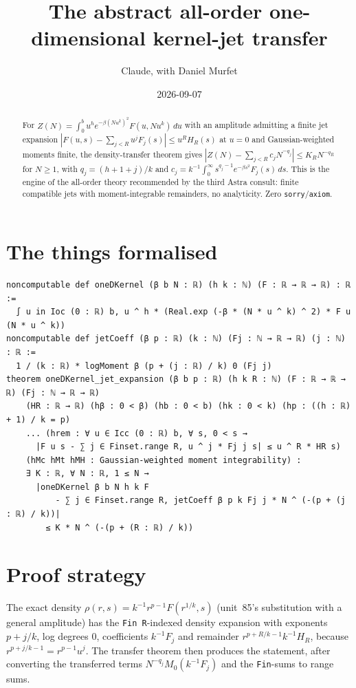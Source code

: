 \documentclass[11pt]{article}
\title{The abstract all-order one-dimensional kernel-jet transfer}
\author{Claude, with Daniel Murfet}
\date{2026-09-07}
\begin{document}
\maketitle
\sloppy

\begin{abstract}
For $Z(N)=\int_0^bu^he^{-\beta(Nu^k)^2}F(u,Nu^k)\,du$ with an amplitude admitting a finite jet
expansion $|F(u,s)-\sum_{j<R}u^jF_j(s)|\le u^RH_R(s)$ at $u=0$ and Gaussian-weighted moments finite,
the density-transfer theorem gives $|Z(N)-\sum_{j<R}c_jN^{-q_j}|\le K_RN^{-q_R}$ for $N\ge1$, with
$q_j=(h+1+j)/k$ and $c_j=k^{-1}\int_0^\infty s^{q_j-1}e^{-\beta s^2}F_j(s)\,ds$. This is the engine
of the all-order theory recommended by the third Astra consult: finite compatible jets with
moment-integrable remainders, no analyticity. Zero \texttt{sorry}/\texttt{axiom}.
\end{abstract}

\section{The things formalised}
{\small
\begin{verbatim}
noncomputable def oneDKernel (β b N : ℝ) (h k : ℕ) (F : ℝ → ℝ → ℝ) : ℝ :=
  ∫ u in Ioc (0 : ℝ) b, u ^ h * (Real.exp (-β * (N * u ^ k) ^ 2) * F u (N * u ^ k))
noncomputable def jetCoeff (β p : ℝ) (k : ℕ) (Fj : ℕ → ℝ → ℝ) (j : ℕ) : ℝ :=
  1 / (k : ℝ) * logMoment β (p + (j : ℝ) / k) 0 (Fj j)
theorem oneDKernel_jet_expansion (β b p : ℝ) (h k R : ℕ) (F : ℝ → ℝ → ℝ) (Fj : ℕ → ℝ → ℝ)
    (HR : ℝ → ℝ) (hβ : 0 < β) (hb : 0 < b) (hk : 0 < k) (hp : ((h : ℝ) + 1) / k = p)
    ... (hrem : ∀ u ∈ Icc (0 : ℝ) b, ∀ s, 0 < s →
      |F u s - ∑ j ∈ Finset.range R, u ^ j * Fj j s| ≤ u ^ R * HR s)
    (hMc hMt hMH : Gaussian-weighted moment integrability) :
    ∃ K : ℝ, ∀ N : ℝ, 1 ≤ N →
      |oneDKernel β b N h k F
          - ∑ j ∈ Finset.range R, jetCoeff β p k Fj j * N ^ (-(p + (j : ℝ) / k))|
        ≤ K * N ^ (-(p + (R : ℝ) / k))
\end{verbatim}
}

\section{Proof strategy}
The exact density $\rho(r,s)=k^{-1}r^{p-1}F(r^{1/k},s)$ (unit~85's substitution with a general
amplitude) has the \texttt{Fin R}-indexed density expansion with exponents $p+j/k$, log degrees $0$,
coefficients $k^{-1}F_j$ and remainder $r^{p+R/k-1}k^{-1}H_R$, because $r^{p+j/k-1}=r^{p-1}u^j$. The
transfer theorem then produces the statement, after converting the transferred terms
$N^{-q_j}M_0(k^{-1}F_j)$ and the \texttt{Fin}-sums to range sums.
\end{document}
